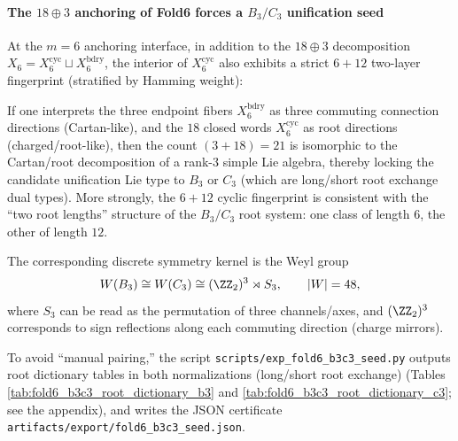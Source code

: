 \paragraph{The \texorpdfstring{$18\oplus 3$}{18+3} anchoring of Fold6 forces a \texorpdfstring{$B_3/C_3$}{B3/C3} unification seed}
At the \(m=6\) anchoring interface, in addition to the \(18\oplus 3\) decomposition \(X_6=X_6^{\mathrm{cyc}}\sqcup X_6^{\mathrm{bdry}}\),
the interior of \(X_6^{\mathrm{cyc}}\) also exhibits a strict \(6+12\) two-layer fingerprint (stratified by Hamming weight):

If one interprets the three endpoint fibers \(X_6^{\mathrm{bdry}}\) as three commuting connection directions (Cartan-like), and the \(18\) closed words \(X_6^{\mathrm{cyc}}\) as root directions (charged/root-like),
then the count \((3+18)=21\) is isomorphic to the Cartan/root decomposition of a rank-\(3\) simple Lie algebra, thereby locking the candidate unification Lie type to \(B_3\) or \(C_3\) (which are long/short root exchange dual types).
More strongly, the \(6+12\) cyclic fingerprint is consistent with the ``two root lengths'' structure of the \(B_3/C_3\) root system: one class of length \(6\), the other of length \(12\).
\par
The corresponding discrete symmetry kernel is the Weyl group
\[
W(B_3)\cong W(C_3)\cong (\ZZ_2)^3\rtimes S_3,\qquad |W|=48,
\]
where \(S_3\) can be read as the permutation of three channels/axes, and \((\ZZ_2)^3\) corresponds to sign reflections along each commuting direction (charge mirrors).
\par
To avoid ``manual pairing,'' the script \texttt{scripts/exp\_fold6\_b3c3\_seed.py} outputs root dictionary tables in both normalizations (long/short root exchange) (Tables \ref{tab:fold6_b3c3_root_dictionary_b3} and \ref{tab:fold6_b3c3_root_dictionary_c3}; see the appendix), and writes the JSON certificate \texttt{artifacts/export/fold6\_b3c3\_seed.json}.


